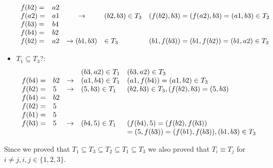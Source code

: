 \begin{exercise}{5}
\begin{subexercise}
\begin{itemize}
\begin{displaymath}
\begin{array}{ l l c l l }
        f(b2) = & a2 & & & \\
        f(a2) = & a1 & \rightarrow & (b2,b3)\in T_3 & (f(b2),b3) = (f(a2),b3) =
        (a1,b3) \in T_2\\

        f(b3) = & b4 & & & \\
        f(b4) = & b2 & & & \\
        f(b2) = & a2 & \rightarrow (b1,b3) & \in T_3 & (b1,f(b3)) = (b1,f(b2)) =
        (b1,a2) \in T_2
      \end{array}
    \end{displaymath}
    \item $T_1\subseteq T_3$?:
    \begin{displaymath}
      \begin{array}{ l l c l l }
        & & & (b3,a2)\in T_1 & (b3,a2)\in T_3\\
        f(b4) = & b2 & \rightarrow &(a1,b4) \in T_1 & (a1, f(b4)) = (a1, b2)\in
        T_3 \\

        f(b2)= & 5 & \rightarrow &(5,b3) \in T_1 & (b2,b3)\in T_3, (f(b2),b3) =
        (5,b3)\\

        f(b4) =& b2 & & & \\
        f(b2) =& 5 & & & \\
        f(b1) =& 5 & & & \\
        f(b3) =& 5 & \rightarrow & (b4,5)\in T_1 & (f(b4),5) = (f(b2),f(b3))\\
        & & & & =(5,f(b3)) = (f(b1),f(b3)), (b1,b3)\in T_3
      \end{array}
    \end{displaymath}
  \end{itemize}
  Since we proved that $T_1\subseteq T_3 \subseteq T_2 \subseteq T_1 \subseteq
  T_3$ we also proved that $T_i \equiv T_j$ for $i\neq j,i,j\in\{1,2,3\}$.
\end{subexercise}

\begin{subexercise}
\end{subexercise}


\end{exercise}
